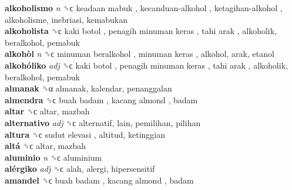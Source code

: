 \textbf{alkoholismo} \emph{n}  ␝ϲ   keadaan mabuk ,  kecanduan-alkohol ,  ketagihan-alkohol , alkoholisme, inebriasi, kemabukan  \\
\textbf{alkoholista} ␝ϲ   kaki botol ,  penagih minuman keras ,  tahi arak , alkoholik, beralkohol, pemabuk  \\
\textbf{alkohòl} \emph{n}  ␝ϲ   minuman beralkohol ,  minuman keras , alkohol, arak, etanol  \\
\textbf{alkohóliko} \emph{adj}  ␝ϲ   kaki botol ,  penagih minuman keras ,  tahi arak , alkoholik, beralkohol, pemabuk  \\
\textbf{almanak} ␝α  almanak, kalendar, penanggalan  \\
\textbf{almendra} ␝ϲ   buah badam ,  kacang almond , badam  \\
\textbf{altar} ␝ϲ  altar, mazbah  \\
\textbf{alternativo} \emph{adj}  ␝ϲ  alternatif, lain, pemilihan, pilihan  \\
\textbf{altura} ␝ϲ   sudut elevasi , altitud, ketinggian  \\
\textbf{altá} ␝ϲ  altar, mazbah  \\
\textbf{aluminio} \emph{n}  ␝ϲ  aluminium  \\
\textbf{alérgiko} \emph{adj}  ␝ϲ  alah, alergi, hipersensitif  \\
\textbf{amandel} ␝ϲ   buah badam ,  kacang almond , badam  \\
